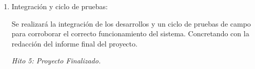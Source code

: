 \begin{enumerate}
            \item Integración y ciclo de pruebas:
                \par Se realizará la integración de los desarrollos y un ciclo de pruebas de campo para corroborar el correcto funcionamiento del sistema. Concretando con la redacción del informe final del proyecto.
                \par \textit{Hito 5: Proyecto Finalizado.}

        \end{enumerate}
